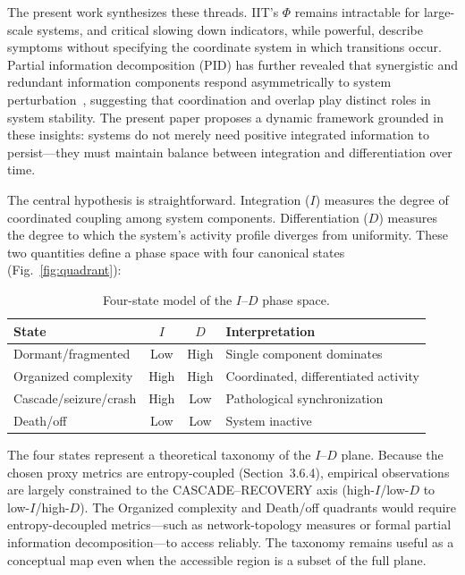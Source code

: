 \documentclass[12pt,a4paper]{article}
\begin{document}
The present work synthesizes these threads. IIT's $\Phi$ remains intractable for large-scale systems, and critical slowing down indicators, while powerful, describe symptoms without specifying the coordinate system in which transitions occur. Partial information decomposition (PID) has further revealed that synergistic and redundant information components respond asymmetrically to system perturbation~\cite{williams2010,popiel2020}, suggesting that coordination and overlap play distinct roles in system stability. The present paper proposes a dynamic framework grounded in these insights: systems do not merely need positive integrated information to persist---they must maintain balance between integration and differentiation over time.

The central hypothesis is straightforward. Integration ($I$) measures the degree of coordinated coupling among system components. Differentiation ($D$) measures the degree to which the system's activity profile diverges from uniformity. These two quantities define a phase space with four canonical states (Fig.~\ref{fig:quadrant}):

\begin{table}[H]
\caption{Four-state model of the $I$--$D$ phase space.\label{tab:four_state}}
\begin{tabular}{@{}lccp{3.0cm}@{}}
\toprule
State & $I$ & $D$ & Interpretation \\
\midrule
Dormant/fragmented & Low & High & Single component dominates \\
Organized complexity & High & High & Coordinated, differentiated activity \\
Cascade/seizure/crash & High & Low & Pathological synchronization \\
Death/off & Low & Low & System inactive \\
\bottomrule
\end{tabular}
\end{table}

The four states represent a theoretical taxonomy of the $I$--$D$ plane. Because the chosen proxy metrics are entropy-coupled (Section~3.6.4), empirical observations are largely constrained to the CASCADE--RECOVERY axis (high-$I$/low-$D$ to low-$I$/high-$D$). The Organized complexity and Death/off quadrants would require entropy-decoupled metrics---such as network-topology measures or formal partial information decomposition---to access reliably. The taxonomy remains useful as a conceptual map even when the accessible region is a subset of the full plane.
\end{document}
